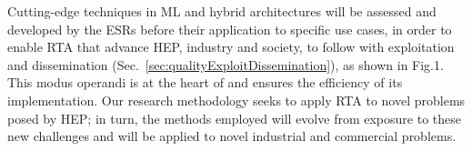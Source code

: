 
Cutting-edge techniques in ML and hybrid architectures will be assessed and developed by the ESRs 
before their application to specific use cases, in order to enable RTA that advance HEP, industry and society, 
to follow with exploitation and dissemination (Sec.~\ref{sec:qualityExploitDissemination}), as shown in Fig.1. 
This modus operandi is at the heart of \acronym and ensures the efficiency of its implementation. 
Our research methodology seeks to apply RTA to novel problems posed by HEP;
in turn, the methods employed will evolve from exposure to these new challenges and
will be applied to novel industrial and commercial problems.


%


